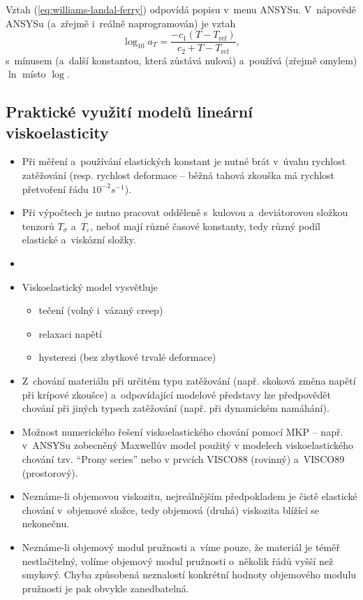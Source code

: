 Vztah (\ref{eq:williams-landal-ferry}) odpovídá popisu v~menu ANSYSu. V~nápovědě ANSYSu (a~zřejmě i~reálně naprogramován) je vztah
\begin{equation}\label{eq:williams-landal-ferry-ansys}
\log_{10} a_T = \frac{-c_1 (T - T_\text{ref})}{c_2 + T - T_\text{ref}},
\end{equation}
s~mínusem (a~další konstantou, která zůstává nulová) a~používá (zřejmě omylem) $\ln$ místo $\log$. 

\subsection{Praktické využití modelů lineární viskoelasticity}
\begin{itemize}
	\item Při měření a~používání elastických konstant je nutné brát v~úvahu rychlost zatěžování (resp. rychlost deformace -- běžná tahová zkouška má rychlost přetvoření řádu $10^{-2} s^{-1}$).
	\item Při výpočtech je nutno pracovat odděleně s~kulovou a~deviátorovou složkou tenzorů $T_\sigma$ a~$T_\varepsilon$, neboť mají různé časové konstanty, tedy různý podíl elastické a~viskózní složky.
	\item {}
	\item Viskoelastický model vysvětluje
	\begin{itemize}
		\item tečení (volný i~vázaný creep)
		\item relaxaci napětí
		\item hysterezi (bez zbytkové trvalé deformace)
	\end{itemize}
	\item Z~chování materiálu při určitém typu zatěžování (např. skoková změna napětí při krípové zkoušce) a~odpovídající modelové představy lze předpovědět chování  při jiných typech zatěžování (např. při dynamickém namáhání).
	\item Možnost numerického řešení viskoelastického chování pomocí MKP -- např. v~ANSYSu zobecněný Maxwellův model použitý v modelech viskoelastického chování tzv. “Prony series” nebo v prvcích VISCO88 (rovinný) a~VISCO89 (prostorový).
	\item Neznáme-li objemovou viskozitu, nejreálnějším předpokladem je čistě elastické chování v~objemové složce, tedy objemová (druhá) viskozita blížící se nekonečnu.
	\item Neznáme-li objemový modul pružnosti a~víme pouze, že materiál je téměř nestlačitelný, volíme objemový modul pružnosti o~několik řádů vyšší než smykový. Chyba způsobená neznalostí konkrétní hodnoty objemového modulu pružnosti je pak obvykle zanedbatelná.
\end{itemize}
